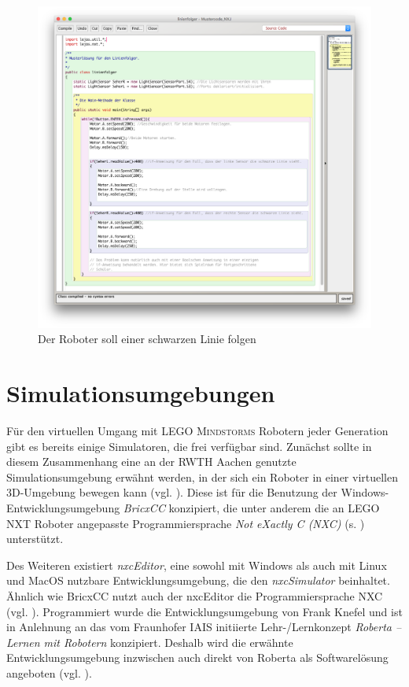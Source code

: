 \documentclass[paper=a4, DIV=calc, BCOR=12mm, twoside=on, onecolumn=on, open = right, titlepage =on, parskip =half-, headsepline = on, footsepline = off, chapterprefix = off, appendixprefix = on, fontsize = 12pt, numbers = noenddot, abstract = on]{scrbook}
\begin{document}
\begin{figure}[htb]
\centering
\includegraphics[width=\textwidth]{images/linienfolger_bluej.png} 
\caption{Der Roboter soll einer schwarzen Linie folgen}
\label{fig:Bsp BlueJ Linienfolger}
\end{figure} 

\par \singlespacing
\section{Simulationsumgebungen}
\label{sec:simulationsumgebungen}
\onehalfspacing
Für den virtuellen Umgang mit \textsc{LEGO Mindstorms} Robotern jeder Generation gibt es bereits einige Simulatoren, die frei verfügbar sind.
Zunächst sollte in diesem Zusammenhang eine an der RWTH Aachen genutzte Simulationsumgebung erwähnt werden, in der sich ein Roboter in einer virtuellen 3D-Umgebung bewegen kann (vgl. \cite{rwth}). Diese ist für die Benutzung der Windows-Entwicklungsumgebung \emph{BricxCC} konzipiert, die unter anderem die an \textsc{LEGO} NXT Roboter angepasste Programmiersprache \emph{Not eXactly C (NXC)} (s. \cite{bricxcc}) unterstützt.

Des Weiteren existiert \emph{nxcEditor}, eine sowohl mit Windows als auch mit Linux und \mbox{MacOS} nutzbare Entwicklungsumgebung, die den \emph{nxcSimulator} beinhaltet. Ähnlich wie BricxCC nutzt auch der nxcEditor die Programmiersprache NXC (vgl. \cite{nxceditor}). Programmiert wurde die Entwicklungsumgebung von Frank Knefel und ist in Anlehnung an das vom Fraunhofer IAIS initiierte Lehr-/Lernkonzept \emph{Roberta -- Lernen mit Robotern} konzipiert. Deshalb wird die erwähnte Entwicklungsumgebung inzwischen auch direkt von Roberta als Softwarelösung angeboten (vgl. \cite{roberta}).
\end{document}
